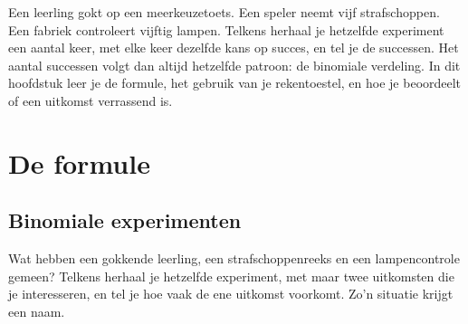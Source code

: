 %



Een leerling gokt op een meerkeuzetoets. Een speler neemt vijf strafschoppen. Een fabriek controleert vijftig lampen. Telkens herhaal je hetzelfde experiment een aantal keer, met elke keer dezelfde kans op succes, en tel je de successen. Het aantal successen volgt dan altijd hetzelfde patroon: de binomiale verdeling. In dit hoofdstuk leer je de formule, het gebruik van je rekentoestel, en hoe je beoordeelt of een uitkomst verrassend is.

\begin{oefeningen}[Start]

\end{oefeningen}


\section{De formule}

\subsection{Binomiale experimenten}

Wat hebben een gokkende leerling, een strafschoppenreeks en een lampencontrole gemeen? Telkens herhaal je hetzelfde experiment, met maar twee uitkomsten die je interesseren, en tel je hoe vaak de ene uitkomst voorkomt. Zo'n situatie krijgt een naam.

